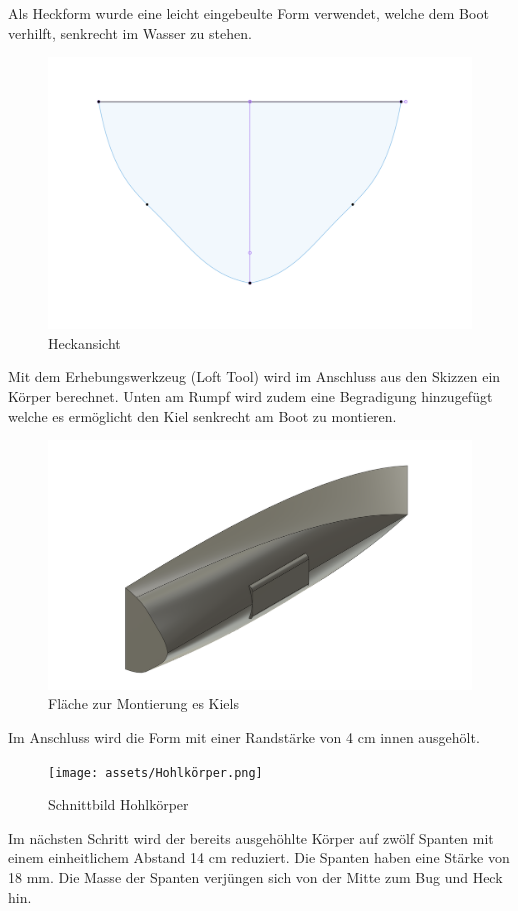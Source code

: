 Als Heckform wurde eine leicht eingebeulte Form verwendet, welche dem Boot verhilft, senkrecht im Wasser zu stehen.

\begin{figure}[H]
    \centering
    \includegraphics[width=0.6\linewidth]{assets/Heck_boot.png}
    \caption{Heckansicht}
   
\end{figure}

Mit dem Erhebungswerkzeug (Loft Tool) wird im Anschluss aus den Skizzen ein Körper berechnet. Unten am Rumpf wird zudem eine Begradigung hinzugefügt welche es ermöglicht den Kiel senkrecht am Boot zu montieren.
\begin{figure}[H]
    \centering
    \includegraphics[width=0.75\linewidth]{assets/kielbefestigung2image.png}
    \caption{Fläche zur Montierung es Kiels}
    \label{fig:enter-label}
\end{figure}

Im Anschluss wird die Form mit einer Randstärke von 4 cm innen ausgehölt. 
\begin{figure}[H]
    \centering
    \texttt{[image: assets/Hohlkörper.png]}
    \caption{Schnittbild Hohlkörper}

\end{figure}
Im nächsten Schritt wird der bereits ausgehöhlte Körper auf zwölf Spanten mit einem einheitlichem Abstand 14 cm reduziert. Die Spanten haben eine Stärke von 18 mm. Die Masse der Spanten verjüngen sich von der Mitte zum Bug und Heck hin.

